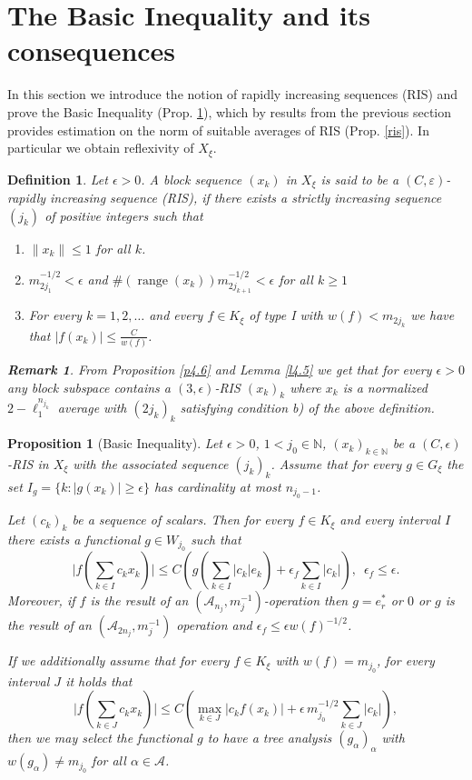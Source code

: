 \documentclass[a4paper]{amsart}
\theoremstyle{plain}
\newtheorem{proposition}[theorem]{Proposition}
\newtheorem{definition}[theorem]{Definition}
\newtheorem{remark}[theorem]{Remark}
\newcommand{\N}{\mathbb{N}}
\newcommand{\mc}{\mathcal}
\newcommand{\e}{\epsilon}
\newcommand{\mca}[1][A]{\mathcal{#1}}
\newcommand{\norm}[1][\cdot]{\lVert #1\rVert}
\DeclareMathOperator{\ran}{range}
\begin{document}
\section{The Basic Inequality and its consequences}\label{sec9}
In this section we introduce the notion of rapidly increasing sequences (RIS) and
prove the Basic Inequality (Prop. \ref{bin}), which by results from the previous section
provides estimation on the norm of suitable averages of RIS (Prop. \ref{ris}). In
particular we obtain reflexivity of $X_\xi$.
\begin{definition}\label{d9.1}
Let $\e>0$. A block sequence $(x_{k})$ in $X_{\xi}$ is said to be a
$(C,\varepsilon)$-rapidly increasing sequence  (RIS), if there
exists a strictly increasing sequence $(j_{k})$ of positive
integers such that
\begin{enumerate}
\item[a)] $\norm[x_{k}]\leq 1$ for all $k$.
\item[b)]
$m_{2j_1}^{-1/2}<\e$ and $\#(\ran(x_{k}))m_{2j_{k+1}}^{-1/2}<\e$
for all $k\geq 1$
\item[c)] For every $k=1,2,\ldots$ and every
$f\in K_{\xi}$ of type  I with $w(f)<m_{2j_{k}}$  we have that $\vert f(x_{k})\vert
\le \frac{C}{w(f)}$.
\end{enumerate}
\begin{remark}\label{r5.2} From  Proposition  \ref{p4.6} and Lemma  \ref{l4.5} we get that  for  every $\e>0$   any block subspace  contains a $(3,\e)$-RIS $(x_{k})_{k}$ where  $x_k$ is a normalized $2-\ell_{1}^{n_{j_k}}$ average with $(2j_k)_{k}$ satisfying  condition b) of the above definition.
\end{remark}
\end{definition}
\begin{proposition}[Basic Inequality]\label{bin}
Let $\e>0$, $1<j_0\in\N$, $(x_{k})_{k\in\N}$ be a $(C,\e)$-RIS in  $X_{\xi}$  with the associated sequence $(j_{k})_{k}$.
 Assume that for   every $g\in G_{\xi}$ the set
$I_{g}=\{k:\vert g(x_k)\vert\geq \e\}$
has cardinality at most $n_{j_0-1}$.


Let $(c_{k})_{k}$ be a sequence of scalars.
Then for every $f\in K_{\xi}$ and every interval $I$ there exists a functional $g\in W_{j_0}$ such that
\begin{equation}\label{ll1}
\vert f(\sum_{k\in I}c_{k}x_{k})\vert\leq C(g(\sum_{k\in
I}\vert c_k\vert e_{k})+\e_{f}\sum_{k\in I}\vert
c_k\vert),\,\,\,\e_{f}\leq \e.
\end{equation}
Moreover, if $f$ is the result of an $(\mc{A}_{n_{j}},m_{j}^{-1})$-operation then
$g=e^{*}_{r}$ or $0$ or $g$ is the result of an $(\mca_{2n_{j}}, m_{j}^{-1})$ operation and $\e_{f}\leq \e w(f)^{-1/2}$.


If we additionally assume that for every  $f\in K_{\xi}$ with $w(f)=m_{j_0}$, for every interval $J$   it holds that
\begin{equation}\label{ada}
\vert f(\sum_{k\in J}c_{k}x_{k})\vert
\leq C(\max_{k\in J}\vert c_kf(x_k)\vert+\e\,m_{j_0}^{-1/2}\sum_{k\in J}\vert c_k\vert),
\end{equation}
then we may select the functional $g$ to have a tree analysis $(g_{\alpha})_{\alpha}$ with $w(g_{\alpha})\ne m_{j_0}$ for all $\alpha\in\mc{A}$.
\end{proposition}
\end{document}
